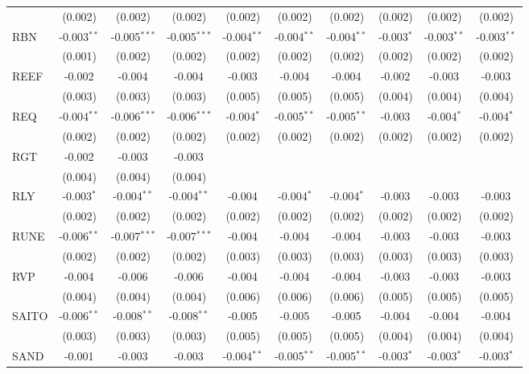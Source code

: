 \begin{table}[!htbp]
\begin{tabular}{@{\extracolsep{5pt}}lccccccccc}
  & (0.002) & (0.002) & (0.002) & (0.002) & (0.002) & (0.002) & (0.002) & (0.002) & (0.002) \\
 RBN & -0.003$^{**}$ & -0.005$^{***}$ & -0.005$^{***}$ & -0.004$^{**}$ & -0.004$^{**}$ & -0.004$^{**}$ & -0.003$^{*}$ & -0.003$^{**}$ & -0.003$^{**}$ \\
  & (0.001) & (0.002) & (0.002) & (0.002) & (0.002) & (0.002) & (0.002) & (0.002) & (0.002) \\
 REEF & -0.002$^{}$ & -0.004$^{}$ & -0.004$^{}$ & -0.003$^{}$ & -0.004$^{}$ & -0.004$^{}$ & -0.002$^{}$ & -0.003$^{}$ & -0.003$^{}$ \\
  & (0.003) & (0.003) & (0.003) & (0.005) & (0.005) & (0.005) & (0.004) & (0.004) & (0.004) \\
 REQ & -0.004$^{**}$ & -0.006$^{***}$ & -0.006$^{***}$ & -0.004$^{*}$ & -0.005$^{**}$ & -0.005$^{**}$ & -0.003$^{}$ & -0.004$^{*}$ & -0.004$^{*}$ \\
  & (0.002) & (0.002) & (0.002) & (0.002) & (0.002) & (0.002) & (0.002) & (0.002) & (0.002) \\
 RGT & -0.002$^{}$ & -0.003$^{}$ & -0.003$^{}$ & & & & & & \\
  & (0.004) & (0.004) & (0.004) & & & & & & \\
 RLY & -0.003$^{*}$ & -0.004$^{**}$ & -0.004$^{**}$ & -0.004$^{}$ & -0.004$^{*}$ & -0.004$^{*}$ & -0.003$^{}$ & -0.003$^{}$ & -0.003$^{}$ \\
  & (0.002) & (0.002) & (0.002) & (0.002) & (0.002) & (0.002) & (0.002) & (0.002) & (0.002) \\
 RUNE & -0.006$^{**}$ & -0.007$^{***}$ & -0.007$^{***}$ & -0.004$^{}$ & -0.004$^{}$ & -0.004$^{}$ & -0.003$^{}$ & -0.003$^{}$ & -0.003$^{}$ \\
  & (0.002) & (0.002) & (0.002) & (0.003) & (0.003) & (0.003) & (0.003) & (0.003) & (0.003) \\
 RVP & -0.004$^{}$ & -0.006$^{}$ & -0.006$^{}$ & -0.004$^{}$ & -0.004$^{}$ & -0.004$^{}$ & -0.003$^{}$ & -0.003$^{}$ & -0.003$^{}$ \\
  & (0.004) & (0.004) & (0.004) & (0.006) & (0.006) & (0.006) & (0.005) & (0.005) & (0.005) \\
 SAITO & -0.006$^{**}$ & -0.008$^{**}$ & -0.008$^{**}$ & -0.005$^{}$ & -0.005$^{}$ & -0.005$^{}$ & -0.004$^{}$ & -0.004$^{}$ & -0.004$^{}$ \\
  & (0.003) & (0.003) & (0.003) & (0.005) & (0.005) & (0.005) & (0.004) & (0.004) & (0.004) \\
 SAND & -0.001$^{}$ & -0.003$^{}$ & -0.003$^{}$ & -0.004$^{**}$ & -0.005$^{**}$ & -0.005$^{**}$ & -0.003$^{*}$ & -0.003$^{*}$ & -0.003$^{*}$ \\

\end{tabular}
\end{table}
